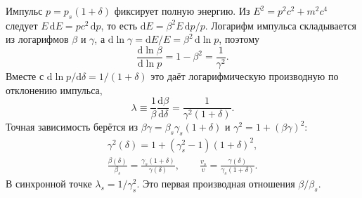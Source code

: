 Импульс $p=p_s(1+\delta)$ фиксирует полную энергию. Из $E^2=p^2c^2+m^2c^4$ следует $E\,\mathrm{d}E=pc^2\,\mathrm{d}p$, то есть $\mathrm{d}E=\beta^2 E\,\mathrm{d}p/p$. Логарифм импульса складывается из логарифмов $\beta$ и $\gamma$, а $\mathrm{d}\ln\gamma=\mathrm{d}E/E=\beta^2\,\mathrm{d}\ln p$, поэтому
\begin{equation}
\label{eq:mag-dlnbeta}
\frac{\mathrm{d}\ln\beta}{\mathrm{d}\ln p}=1-\beta^2=\frac{1}{\gamma^2}.
\end{equation}
Вместе с $\mathrm{d}\ln p/\mathrm{d}\delta=1/(1+\delta)$ это даёт логарифмическую производную по отклонению импульса,
\begin{equation}
\label{eq:mag-lambda}
\lambda\equiv\frac{1}{\beta}\frac{\mathrm{d}\beta}{\mathrm{d}\delta}=\frac{1}{\gamma^2(1+\delta)}.
\end{equation}
Точная зависимость берётся из $\beta\gamma=\beta_s\gamma_s(1+\delta)$ и $\gamma^2=1+(\beta\gamma)^2$:
\begin{gather}
\label{eq:mag-gamma}
\gamma^2(\delta)=1+(\gamma_s^2-1)(1+\delta)^2,\\
\label{eq:mag-beta}
\frac{\beta(\delta)}{\beta_s}=\frac{\gamma_s(1+\delta)}{\gamma(\delta)},
\qquad
\frac{v_s}{v}=\frac{\gamma(\delta)}{\gamma_s(1+\delta)}.
\end{gather}
В синхронной точке $\lambda_s=1/\gamma_s^2$. Это первая производная отношения $\beta/\beta_s$.

